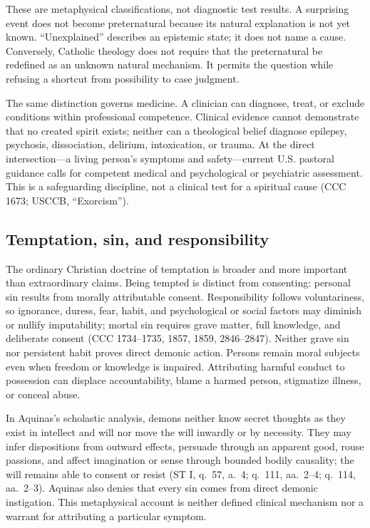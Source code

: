 These are metaphysical classifications, not diagnostic test results. A
surprising event does not become preternatural because its natural explanation
is not yet known. ``Unexplained'' describes an epistemic state; it does not
name a cause. Conversely, Catholic theology does not require that the
preternatural be redefined as an unknown natural mechanism. It permits the
question while refusing a shortcut from possibility to case judgment.

The same distinction governs medicine. A clinician can diagnose, treat, or
exclude conditions within professional competence. Clinical evidence cannot
demonstrate that no created spirit exists; neither can a theological belief
diagnose epilepsy, psychosis, dissociation, delirium, intoxication, or trauma.
At the direct intersection---a living person's symptoms and safety---current
U.S. pastoral guidance calls for competent medical and psychological or
psychiatric assessment. This is a safeguarding discipline, not a clinical test
for a spiritual cause (CCC 1673; USCCB, ``Exorcism'').

\subsection{Temptation, sin, and responsibility}

The ordinary Christian doctrine of temptation is broader and more important
than extraordinary claims. Being tempted is distinct from consenting:
personal sin results from morally attributable consent. Responsibility follows
voluntariness, so ignorance, duress, fear, habit, and psychological or social
factors may diminish or nullify imputability; mortal sin requires grave matter,
full knowledge, and deliberate consent (CCC 1734--1735, 1857, 1859,
2846--2847). Neither grave sin nor persistent habit proves direct demonic
action. Persons remain moral subjects even when freedom or knowledge is
impaired. Attributing harmful conduct to possession can displace
accountability, blame a harmed person, stigmatize illness, or conceal abuse.

In Aquinas's scholastic analysis, demons neither know secret thoughts as they
exist in intellect and will nor move the will inwardly or by necessity. They
may infer dispositions from outward effects, persuade through an apparent
good, rouse passions, and affect imagination or sense through bounded bodily
causality; the will remains able to consent or resist (ST I, q.~57, a.~4;
q.~111, aa.~2--4; q.~114, aa.~2--3). Aquinas also denies that every sin comes
from direct demonic instigation. This metaphysical account is neither defined
clinical mechanism nor a warrant for attributing a particular symptom.

